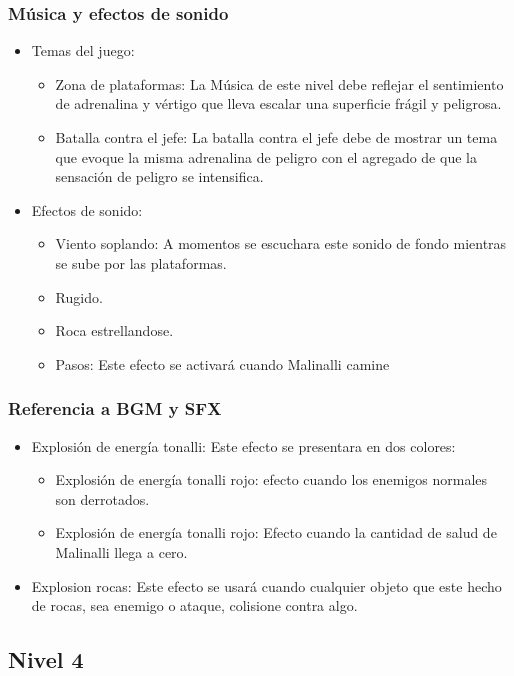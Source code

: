 \documentclass[11pt,letterpaper]{article}
\begin{document}
	\subsubsection{Música y efectos de sonido}
\begin{itemize}
	\item Temas del juego:
		\begin{itemize}
			\item Zona de plataformas: La Música  de este nivel debe reflejar el sentimiento de adrenalina y vértigo que lleva escalar una superficie frágil y peligrosa.
			\item Batalla contra el jefe: La batalla contra el jefe debe de mostrar un tema que evoque la misma adrenalina de peligro con el agregado de que la sensación de peligro se intensifica.
		\end{itemize}
	\item Efectos de sonido:
		\begin{itemize}
			\item Viento soplando: A momentos se escuchara este sonido de fondo mientras se sube por las plataformas.
			\item Rugido.
			\item Roca estrellandose.
			\item Pasos: Este efecto se activará cuando Malinalli camine
		\end{itemize}
\end{itemize} 
	\subsubsection{Referencia a BGM y SFX}
\begin{itemize}
	\item Explosión de energía tonalli: Este efecto se presentara en dos colores:
	\begin{itemize}
		\item Explosión de energía tonalli rojo: efecto cuando los enemigos normales son derrotados.
		\item Explosión de energía tonalli rojo: Efecto cuando la cantidad de salud de Malinalli llega a cero.
	\end{itemize}
	\item Explosion rocas: Este efecto se usará cuando cualquier objeto que este hecho de rocas, sea enemigo o ataque, colisione contra algo.
\end{itemize}

        \subsection{Nivel 4}
\end{document}
